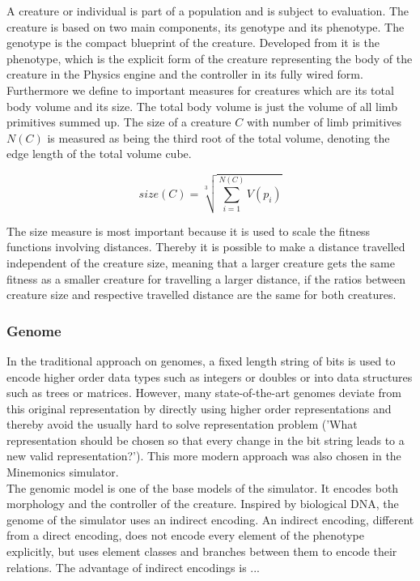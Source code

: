 \documentclass[main]{subfiles}
\begin{document}
A creature or individual is part of a population and is subject to evaluation. The creature is based on two main components, its genotype and its phenotype. The genotype is the compact blueprint of the creature. Developed from it is the phenotype, which is the explicit form of the creature representing the body of the creature in the Physics engine and the controller in its fully wired form. Furthermore we define to important measures for creatures which are its total body volume and its size. The total body volume is just the volume of all limb primitives summed up. The size of a creature \(C\) with number of limb primitives \(N(C)\) is measured as being the third root of the total volume, denoting the edge length of the total volume cube. 

\[size(C) = \sqrt[3]{\sum\limits^{N(C)}_{i=1} V(p_i)}\]

The size measure is most important because it is used to scale the fitness functions involving distances. Thereby it is possible to make a distance travelled independent of the creature size, meaning that a larger creature gets the same fitness as a smaller creature for travelling a larger distance, if the ratios between creature size and respective travelled distance are the same for both creatures.

\subsubsection{Genome}

In the traditional approach on genomes, a fixed length string of bits is used to encode higher order data types such as integers or doubles or into data structures such as trees or matrices. However, many state-of-the-art genomes deviate from this original representation by directly using higher order representations and thereby avoid the usually hard to solve representation problem ('What representation should be chosen so that every change in the bit string leads to a new valid representation?'). This more modern approach was also chosen in the Minemonics simulator.\\

The genomic model is one of the base models of the simulator. It encodes both morphology and the controller of the creature. Inspired by biological DNA, the genome of the simulator uses an indirect encoding. An indirect encoding, different from a direct encoding, does not encode every element of the phenotype explicitly, but uses element classes and branches between them to encode their relations. The advantage of indirect encodings is ...
\end{document}
